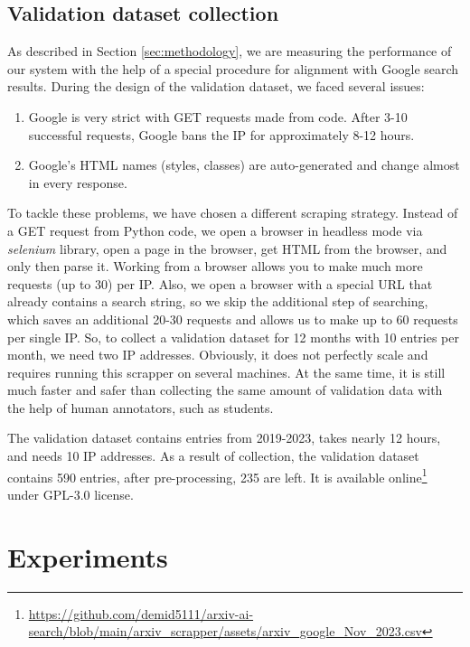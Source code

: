 \documentclass{article}
\begin{document}
    
    \subsection{Validation dataset collection}

        As described in Section \ref{sec:methodology}, we are measuring the performance of our system with the help of a special procedure for alignment with Google search results. During the design of the validation dataset, we faced several issues:
        
        \begin{enumerate}
            \item Google is very strict with GET requests made from code. After 3-10 successful requests, Google bans the IP for approximately 8-12 hours.
            \item Google's HTML names (styles, classes) are auto-generated and change almost in every response. 
        \end{enumerate}

        To tackle these problems, we have chosen a different scraping strategy. Instead of a GET request from Python code, we open a browser in headless mode via \textit{selenium} library, open a page in the browser, get HTML from the browser, and only then parse it. Working from a browser allows you to make much more requests (up to 30) per IP. Also, we open a browser with a special URL that already contains a search string, so we skip the additional step of searching, which saves an additional 20-30 requests and allows us to make up to 60 requests per single IP. So, to collect a validation dataset for 12 months with 10 entries per month, we need two IP addresses. Obviously, it does not perfectly scale and requires running this scrapper on several machines. At the same time, it is still much faster and safer than collecting the same amount of validation data with the help of human annotators, such as students.

        The validation dataset contains entries from 2019-2023, takes nearly 12 hours, and needs 10 IP addresses. As a result of collection, the validation dataset contains 590 entries, after pre-processing, 235 are left. It is available online\footnote{\url{https://github.com/demid5111/arxiv-ai-search/blob/main/arxiv_scrapper/assets/arxiv_google_Nov_2023.csv}} under GPL-3.0 license.

\section{Experiments}
\end{document}

